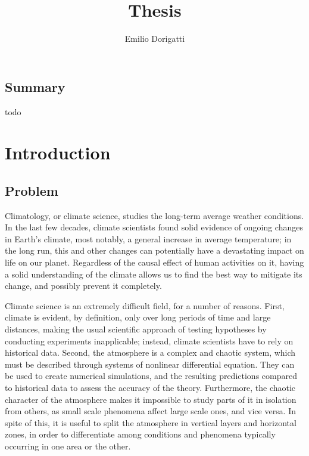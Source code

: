\documentclass[12pt]{book}
\begin{document}
\title{Thesis}
\author{Emilio Dorigatti}

\maketitle

\section*{Summary}
todo

\tableofcontents

\chapter{Introduction}

\section{Problem}

Climatology, or climate science, studies the long-term average weather conditions. In the last few decades, climate scientists found solid evidence of ongoing changes in Earth's climate, most notably, a general increase in average temperature; in the long run, this and other changes can potentially have a devastating impact on life on our planet. Regardless of the causal effect of human activities on it, having a solid understanding of the climate allows us to find the best way to mitigate its change, and possibly prevent it completely.

Climate science is an extremely difficult field, for a number of reasons. First, climate is evident, by definition, only over long periods of time and large distances, making the usual scientific approach of testing hypotheses by conducting experiments inapplicable; instead, climate scientists have to rely on historical data. Second, the atmosphere is a complex and chaotic system, which must be described through systems of nonlinear differential equation. They can be used to create numerical simulations, and the resulting predictions compared to historical data to assess the accuracy of the theory. Furthermore, the chaotic character of the atmosphere makes it impossible to study parts of it in isolation from others, as small scale phenomena affect large scale ones, and vice versa. In spite of this, it is useful to split the atmosphere in vertical layers and horizontal zones, in order to differentiate among conditions and phenomena typically occurring in one area or the other.
\end{document}
